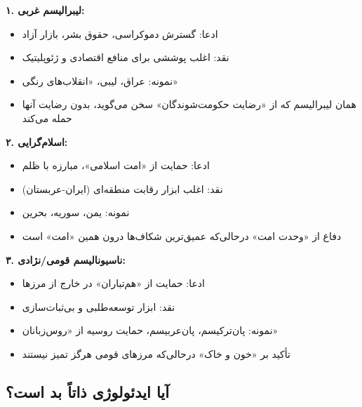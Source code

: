 \begin{tcolorbox}[wavebox, title={ایدئولوژی‌های پشت مداخلات «رهایی‌بخش»}]

\textbf{۱. لیبرالیسم غربی:}
\begin{itemize}
\item ادعا: گسترش دموکراسی، حقوق بشر، بازار آزاد
\item نقد: اغلب پوششی برای منافع اقتصادی و ژئوپلیتیک
\item نمونه: عراق، لیبی، «انقلاب‌های رنگی»
\item {} همان لیبرالیسم که از «رضایت حکومت‌شوندگان»
سخن می‌گوید، بدون رضایت آنها حمله می‌کند
\end{itemize}

\tcblower

\textbf{۲. اسلام‌گرایی:}
\begin{itemize}
\item ادعا: حمایت از «امت اسلامی»، مبارزه با ظلم
\item نقد: اغلب ابزار رقابت منطقه‌ای (ایران-عربستان)
\item نمونه: یمن، سوریه، بحرین
\item {} دفاع از «وحدت امت» درحالی‌که عمیق‌ترین
شکاف‌ها درون همین «امت» است
\end{itemize}

\tcblower

\textbf{۳. ناسیونالیسم قومی/نژادی:}
\begin{itemize}
\item ادعا: حمایت از «هم‌تباران» در خارج از مرزها
\item نقد: ابزار توسعه‌طلبی و بی‌ثبات‌سازی
\item نمونه: پان‌ترکیسم، پان‌عربیسم، حمایت روسیه از «روس‌زبانان»
\item {} تأکید بر «خون و خاک» درحالی‌که مرزهای
قومی هرگز تمیز نیستند
\end{itemize}
\end{tcolorbox}


\subsection{آیا ایدئولوژی ذاتاً بد است؟}

